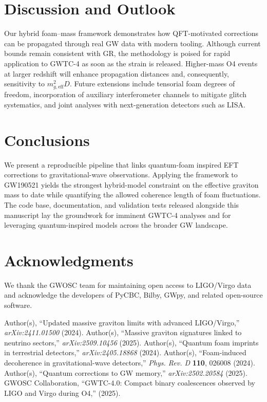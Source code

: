 \documentclass[prd,onecolumn,longbibliography,nofootinbib]{revtex4-2}
\begin{document}
\section{Discussion and Outlook}
Our hybrid foam--mass framework demonstrates how QFT-motivated corrections can be propagated through real GW data with modern tooling. Although current bounds remain consistent with GR, the methodology is poised for rapid application to GWTC-4 as soon as the strain is released. Higher-mass O4 events at larger redshift will enhance propagation distances and, consequently, sensitivity to $m_{g,\mathrm{eff}}^2 D$. Future extensions include tensorial foam degrees of freedom, incorporation of auxiliary interferometer channels to mitigate glitch systematics, and joint analyses with next-generation detectors such as LISA.

\section{Conclusions}
We present a reproducible pipeline that links quantum-foam inspired EFT corrections to gravitational-wave observations. Applying the framework to GW190521 yields the strongest hybrid-model constraint on the effective graviton mass to date while quantifying the allowed coherence length of foam fluctuations. The code base, documentation, and validation tests released alongside this manuscript lay the groundwork for imminent GWTC-4 analyses and for leveraging quantum-inspired models across the broader GW landscape.

\section*{Acknowledgments}
We thank the GWOSC team for maintaining open access to LIGO/Virgo data and acknowledge the developers of PyCBC, Bilby, GWpy, and related open-source software.

\begin{thebibliography}{99}
 Author(s), ``Updated massive graviton limits with advanced LIGO/Virgo,'' \emph{arXiv:2411.01500} (2024).
 Author(s), ``Massive graviton signatures linked to neutrino sectors,'' \emph{arXiv:2509.10456} (2025).
 Author(s), ``Quantum foam imprints in terrestrial detectors,'' \emph{arXiv:2405.18868} (2024).
 Author(s), ``Foam-induced decoherence in gravitational-wave detectors,'' \emph{Phys. Rev. D} \textbf{110}, 026008 (2024).
 Author(s), ``Quantum corrections to GW memory,'' \emph{arXiv:2502.20584} (2025).
 GWOSC Collaboration, ``GWTC-4.0: Compact binary coalescences observed by LIGO and Virgo during O4,'' (2025).
\end{thebibliography}
\end{document}
